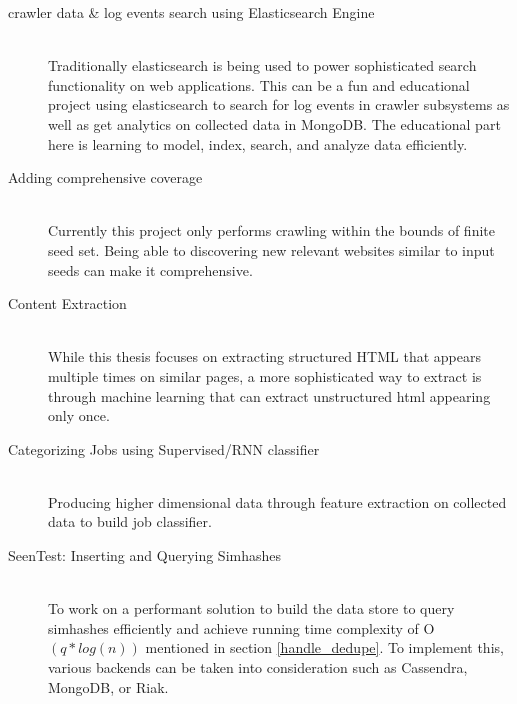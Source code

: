 \begin{description}
  \item[crawler data \& log events search using Elasticsearch Engine] \hfill \\
    Traditionally elasticsearch is being used to power sophisticated search functionality on web
    applications. This can be a fun and educational project using elasticsearch to search for log
    events in crawler subsystems as well as get analytics on collected data in MongoDB. The educational
    part here is learning to model, index, search, and analyze data efficiently.
  \item[Adding comprehensive coverage] \hfill \\
    Currently this project only performs crawling within the bounds of finite seed set. Being able to
    discovering new relevant websites similar to input seeds can make it comprehensive.
  \item[Content Extraction] \hfill \\
    While this thesis focuses on extracting structured HTML that appears multiple times on similar pages,
    a more sophisticated way to extract is through machine learning that can extract unstructured html
    \cite{contentExtract} appearing only once.
  \item[Categorizing Jobs using Supervised/RNN classifier] \hfill \\
    Producing higher dimensional data through feature extraction on collected data to build job
    classifier.
  \item[SeenTest: Inserting and Querying Simhashes] \hfill \\
    To work on a performant solution to build the data store to query simhashes efficiently and achieve
    running time complexity of O$(q * log(n))$ mentioned in section \ref{handle_dedupe}. To implement
    this, various backends can be taken into consideration such as Cassendra, MongoDB, or Riak.
    
\end{description}

\pagebreak